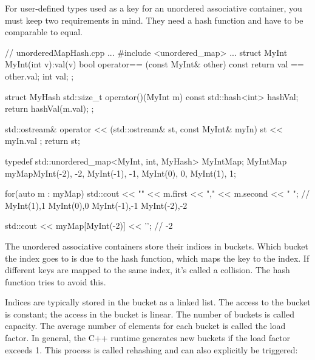 For user-defined types used as a key for an unordered associative container, you must keep two requirements in mind. They need a hash function and have to be comparable to equal.


\begin{cpp}
// unorderedMapHash.cpp
...
#include <unordered_map>
...
struct MyInt{
	MyInt(int v):val(v){}
	bool operator== (const MyInt& other) const {
		return val == other.val;
	}
	int val;
};

struct MyHash{
	std::size_t operator()(MyInt m) const {
		std::hash<int> hashVal;
		return hashVal(m.val);
	}
};

std::ostream& operator << (std::ostream& st, const MyInt& myIn){
	st << myIn.val ;
	return st;
}

typedef std::unordered_map<MyInt, int, MyHash> MyIntMap;
MyIntMap myMap{{MyInt(-2), -2}, {MyInt(-1), -1}, {MyInt(0), 0}, {MyInt(1), 1}};

for(auto m : myMap) std::cout << "{" << m.first << "," << m.second << "} ";
	// {MyInt(1),1} {MyInt(0),0} {MyInt(-1),-1} {MyInt(-2),-2}

std::cout << myMap[MyInt(-2)] << '\n'; // -2
\end{cpp}


The unordered associative containers store their indices in buckets. Which bucket the index goes to is due to the hash function, which maps the key to the index. If different keys are mapped to the same index, it’s called a collision. The hash function tries to avoid this.

Indices are typically stored in the bucket as a linked list. The access to the bucket is constant; the access in the bucket is linear. The number of buckets is called capacity. The average number of elements for each bucket is called the load factor. In general, the C++ runtime generates new buckets if the load factor exceeds 1. This process is called rehashing and can also explicitly be triggered:


